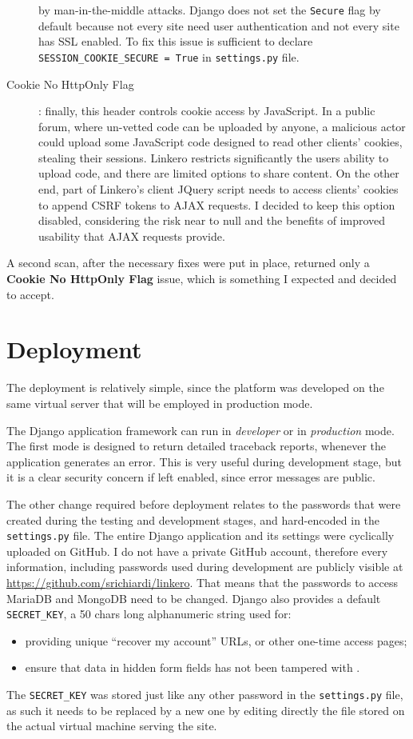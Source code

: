 \begin{description}
  by man-in-the-middle attacks. Django does not set the \texttt{Secure} flag by
  default because not every site need user authentication and not every site has
  SSL enabled. To fix this issue is sufficient to declare
  \texttt{SESSION\_COOKIE\_SECURE = True} in \texttt{settings.py} file.
  \item[Cookie No HttpOnly Flag]: finally, this header controls cookie access by
  JavaScript. In a public forum, where un-vetted code can be uploaded by anyone,
  a malicious actor could upload some JavaScript code designed to read other
  clients' cookies, stealing their sessions. Linkero restricts significantly the
  users ability to upload code, and there are limited options to share content.
  On the other end, part of Linkero's client JQuery script needs to access
  clients' cookies to append CSRF tokens to AJAX requests. I decided to keep
  this option disabled, considering the risk near to null and the benefits of
  improved usability that AJAX requests provide.
\end{description}

A second scan, after the necessary fixes were put in place, returned only a
\textbf{Cookie No HttpOnly Flag} issue, which is something I expected and
decided to accept.


\section{Deployment}
The deployment is relatively simple, since the platform was developed on the same
virtual server that will be employed in production mode.

The Django application framework can run in \emph{developer} or in
\emph{production} mode. The first mode is designed to return detailed traceback
reports, whenever the application generates an error. This is very useful during
development stage, but it is a clear security concern if left enabled, since
error messages are public.

The other change required before deployment relates to the passwords that were
created during the testing and development stages, and hard-encoded in the
\texttt{settings.py} file. The entire Django application and its settings were
cyclically uploaded on GitHub\texttrademark. I do not have a private
GitHub account, therefore every information, including passwords used during
development are publicly visible at \url{https://github.com/srichiardi/linkero}.
That means that the passwords to access MariaDB and MongoDB need to be changed.
Django also provides a default \texttt{SECRET_KEY}, a 50 chars long
alphanumeric string used for:
\begin{itemize}
  \item providing unique ``recover my account'' URLs, or other one-time access
  pages;
  \item ensure that data in hidden form fields has not been tampered with
  \cite{djsecr}.
\end{itemize}
The \texttt{SECRET_KEY} was stored just like any other password in the
\texttt{settings.py} file, as such it needs to be replaced by a new one
by editing directly the file stored on the actual virtual machine serving
the site.
